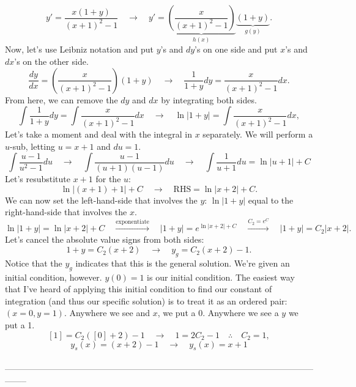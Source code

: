 \documentclass[a4paper,12pt]{article}
\begin{document}
$$ y' = \frac{x(1+y)}{(x+1)^2 - 1} \quad\rightarrow\quad y' = \underbrace{\left(\frac{x}{(x+1)^2-1}\right)}_{h(x)}\underbrace{\left(1+y\right)}_{g(y)}.
$$
Now, let's use Leibniz notation and put $y$'s and $dy$'s on one side and put $x$'s and $dx$'s on the other side.
$$ \frac{dy}{dx} = \left(\frac{x}{(x+1)^2-1}\right){\left(1+y\right)} \quad\rightarrow\quad \frac{1}{1 + y}dy = \frac{x}{(x+1)^2-1}dx. $$
From here, we can remove the $dy$ and $dx$ by integrating both sides.
$$ \int \frac{1}{1 + y}dy = \int \frac{x}{(x+1)^2-1}dx \quad\rightarrow\quad \ln{|1 + y|} = \int \frac{x}{(x+1)^2-1}dx, $$
Let's take a moment and deal with the integral in $x$ separately. We will perform a $u$-sub, letting $u=x+1$ and $du = 1$.
$$ \int \frac{u - 1}{u^2 - 1}du \quad\rightarrow\quad \int \frac{u-1}{(u+1)(u-1)}du \quad\rightarrow\quad  \int \frac{1}{u+1}du = \ln{|u+1|} + C $$
Let's resubstitute $x+1$ for the $u$:
$$ \ln{|(x + 1) + 1|} + C \quad\rightarrow\quad \text{RHS} = \ln{|x + 2|} + C. $$
We can now set the left-hand-side that involves the $y$: $\ln{|1 + y|}$ equal to the right-hand-side that involves the $x$.
$$ \ln{|1 + y|} = \ln{|x + 2|} + C \quad\overset{\text{exponentiate}}\rightarrow\quad |1 + y| = e^{\ln{|x+2|} + C} \quad\overset{C_2=e^{C}}\rightarrow\quad |1+y| = C_2|x+2|.$$
Let's cancel the absolute value signs from both sides:
$$ 1 + y = C_2(x + 2) \quad\rightarrow\quad y_g = C_2(x + 2) - 1. $$
Notice that the $y_g$ indicates that this is the general solution. We're given an initial condition, however. $y(0)=1$ is our initial condition. The easiest way that I've heard of applying this initial condition to find our constant of integration (and thus our specific solution) is to treat it as an ordered pair: $(x=0, y=1)$. Anywhere we see and $x$, we put a 0. Anywhere we see a $y$ we put a 1.\\

$$[1] = C_2([0] + 2) - 1 \quad\rightarrow\quad 1 = 2C_2 - 1 \quad\therefore\quad C_2 = 1,$$
$$ y_s(x) = (x + 2)-1 \quad\rightarrow\quad \boxed{y_s(x) = x + 1} $$
\\
--------------------------------------------------------------------------------------------------------------------

\pagebreak
\end{document}
